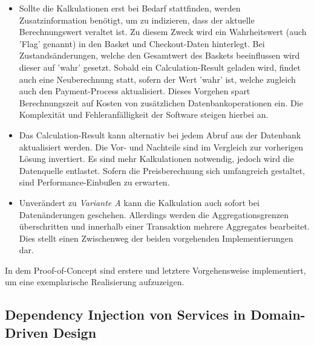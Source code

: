 \begin{itemize}[topsep=-2pt]
	\item { Sollte die Kalkulationen erst bei Bedarf stattfinden, werden Zusatzinformation benötigt, um zu indizieren, dass der aktuelle Berechnungswert veraltet ist. Zu diesem Zweck wird ein Wahrheitswert (auch 'Flag' genannt) in den Basket und Checkout-Daten hinterlegt. Bei Zustandsänderungen, welche den Gesamtwert des Baskets beeinflussen wird dieser auf 'wahr' gesetzt. Sobald ein Calculation-Result geladen wird, findet auch eine Neuberechnung statt, sofern der Wert 'wahr' ist, welche zugleich auch den Payment-Process aktualisiert. Dieses Vorgehen spart Berechnungszeit auf Kosten von zusätzlichen Datenbankoperationen ein. Die Komplexität und Fehleranfälligkeit der Software steigen hierbei an.  }
	\item { Das Calculation-Result kann alternativ bei jedem Abruf aus der Datenbank aktualisiert werden. Die Vor- und Nachteile sind im Vergleich zur vorherigen Lösung invertiert. Es sind mehr Kalkulationen notwendig, jedoch wird die Datenquelle entlastet. Sofern die Preisberechnung sich umfangreich gestaltet, sind Performance-Einbußen zu erwarten.  }
	\item { Unverändert zu \emph{Variante A} kann die Kalkulation auch sofort bei Datenänderungen geschehen. Allerdings werden die Aggregationsgrenzen überschritten und innerhalb einer Transaktion mehrere Aggregates bearbeitet. Dies stellt einen Zwischenweg der beiden vorgehenden Implementierungen dar.  }
\end{itemize}

In dem Proof-of-Concept sind erstere und letztere Vorgehensweise implementiert, um eine exemplarische Realisierung aufzuzeigen. 

\subsection{Dependency Injection von Services in Domain-Driven Design}

